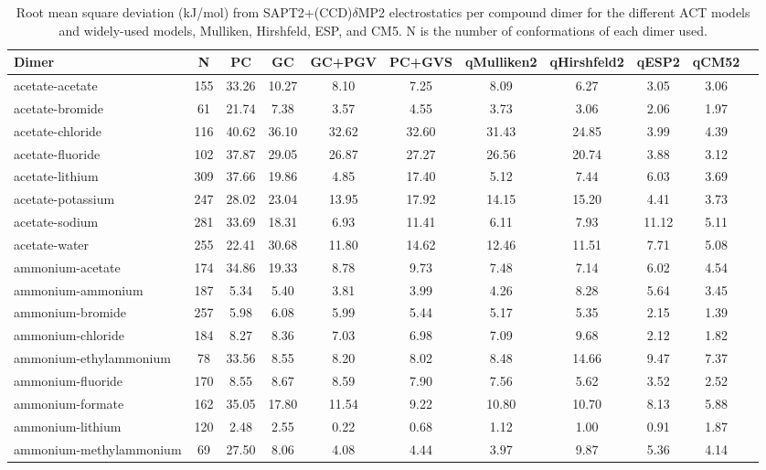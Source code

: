 \begin{longtable}{lcccccccccc}
\caption{Root mean square deviation (kJ/mol) from SAPT2+(CCD)$\delta$MP2 electrostatics per compound dimer for the different ACT models and widely-used models, Mulliken, Hirshfeld, ESP, and CM5. N is the number of conformations of each dimer used.}\\
\hline
Dimer & N  & PC & GC & GC+PGV & PC+GVS & qMulliken2 & qHirshfeld2 & qESP2 & qCM52\\
\hline
acetate-acetate & 155  & 33.26 & 10.27 & 8.10 & 7.25 & 8.09 & 6.27 & 3.05 & 3.06\\
acetate-bromide & 61  & 21.74 & 7.38 & 3.57 & 4.55 & 3.73 & 3.06 & 2.06 & 1.97\\
acetate-chloride & 116  & 40.62 & 36.10 & 32.62 & 32.60 & 31.43 & 24.85 & 3.99 & 4.39\\
acetate-fluoride & 102  & 37.87 & 29.05 & 26.87 & 27.27 & 26.56 & 20.74 & 3.88 & 3.12\\
acetate-lithium & 309  & 37.66 & 19.86 & 4.85 & 17.40 & 5.12 & 7.44 & 6.03 & 3.69\\
acetate-potassium & 247  & 28.02 & 23.04 & 13.95 & 17.92 & 14.15 & 15.20 & 4.41 & 3.73\\
acetate-sodium & 281  & 33.69 & 18.31 & 6.93 & 11.41 & 6.11 & 7.93 & 11.12 & 5.11\\
acetate-water & 255  & 22.41 & 30.68 & 11.80 & 14.62 & 12.46 & 11.51 & 7.71 & 5.08\\
ammonium-acetate & 174  & 34.86 & 19.33 & 8.78 & 9.73 & 7.48 & 7.14 & 6.02 & 4.54\\
ammonium-ammonium & 187  & 5.34 & 5.40 & 3.81 & 3.99 & 4.26 & 8.28 & 5.64 & 3.45\\
ammonium-bromide & 257  & 5.98 & 6.08 & 5.99 & 5.44 & 5.17 & 5.35 & 2.15 & 1.39\\
ammonium-chloride & 184  & 8.27 & 8.36 & 7.03 & 6.98 & 7.09 & 9.68 & 2.12 & 1.82\\
ammonium-ethylammonium & 78  & 33.56 & 8.55 & 8.20 & 8.02 & 8.48 & 14.66 & 9.47 & 7.37\\
ammonium-fluoride & 170  & 8.55 & 8.67 & 8.59 & 7.90 & 7.56 & 5.62 & 3.52 & 2.52\\
ammonium-formate & 162  & 35.05 & 17.80 & 11.54 & 9.22 & 10.80 & 10.70 & 8.13 & 5.88\\
ammonium-lithium & 120  & 2.48 & 2.55 & 0.22 & 0.68 & 1.12 & 1.00 & 0.91 & 1.87\\
ammonium-methylammonium & 69  & 27.50 & 8.06 & 4.08 & 4.44 & 3.97 & 9.87 & 5.36 & 4.14\\

\end{longtable}
